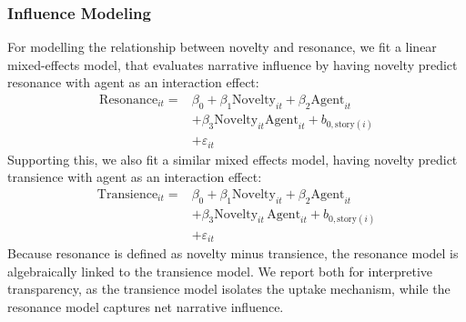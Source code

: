\documentclass[11pt]{article}
\begin{document}
\subsubsection{Influence Modeling}
For modelling the relationship between novelty and resonance, we fit a linear mixed-effects model, that evaluates narrative influence by having novelty predict resonance with agent as an interaction effect:
\begin{equation}
\begin{aligned}
\mathrm{Resonance}_{it} ={}& \beta_0 + \beta_1 \mathrm{Novelty}_{it} + \beta_2 \mathrm{Agent}_{it} \\
&+ \beta_3 \mathrm{Novelty}_{it}\mathrm{Agent}_{it}
+ b_{0,\mathrm{story}(i)} \\ &+ \varepsilon_{it}
\end{aligned}
\end{equation}
Supporting this, we also fit a similar mixed effects model, having novelty predict transience with agent as an interaction effect:
\begin{equation}
\begin{aligned}
\mathrm{Transience}_{it} ={}& \beta_0 + \beta_1 \mathrm{Novelty}_{it} + \beta_2 \mathrm{Agent}_{it} \\
&+ \beta_3 \mathrm{Novelty}_{it}\,\mathrm{Agent}_{it}
+ b_{0,\mathrm{story}(i)} \\ &+ \varepsilon_{it}
\end{aligned}
\end{equation}
Because resonance is defined as novelty minus transience, the resonance model is algebraically linked to the transience model. We report both for interpretive transparency, as the transience model isolates the uptake mechanism, while the resonance model captures net narrative influence.
\end{document}
